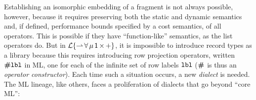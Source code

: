 \documentclass[pldi]{sigplanconf-pldi15}
\begin{document}
Establishing an isomorphic embedding of a fragment is not always possible, however, because it requires preserving both the static and dynamic semantics and, if defined, performance bounds specified by a cost semantics, of all operators. This is possible if they have ``function-like'' semantics, as the list operators do. But in $\mathcal{L}\{{\rightharpoonup}\,{\forall}\,{\mu}\,{{\sf 1}}\,{\times}\,{+}\}$, it is impossible to introduce record types as a library because this requires introducing row projection operators,  written $\textbf{\#}\texttt{lbl}$ in ML, one for each of the infinite set of row labels $\texttt{lbl}$ ($\textbf{\#}$  is thus an \emph{operator constructor}). Each time such a situation occurs,  a new \emph{dialect} is needed. The ML lineage, like others, faces a proliferation of dialects that go beyond ``core ML'':%

\end{document}
